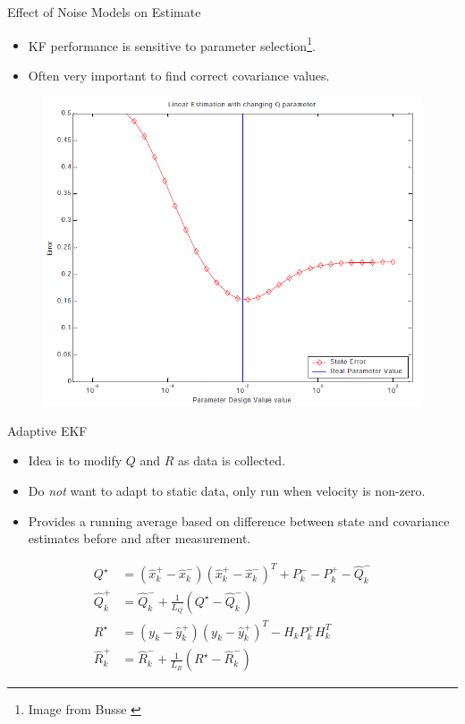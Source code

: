 \documentclass[hyperref={pdfpagelabels=false}]{beamer}
\begin{document}
\begin{frame}{Effect of Noise Models on Estimate}
\begin{itemize}
\item KF performance is sensitive to parameter selection\footnote{Image from Busse \cite{Busse03adaptiveEKF}}.
\item Often very important to find correct covariance values.
\end{itemize}
\begin{figure}[ht!]
	\centering
	\includegraphics[width=.7\textwidth]{images/adaptiveSensitivity}
\end{figure}
\end{frame}

\begin{frame}{Adaptive EKF}
\begin{itemize}
\item Idea is to modify $Q$ and $R$ as data is collected.
\item Do \textit{not} want to adapt to static data, only run when velocity is non-zero.
\item Provides a running average based on difference between state and covariance estimates before and after measurement.
\end{itemize}
\begin{align*}
Q^\star &= \left(\hat{x}_k^+-\hat{x}_k^-\right)\left(\hat{x}_k^+-\hat{x}_k^-\right)^T + P_k^- - P_k^+ - \hat{Q}_k^- \\
\hat{Q}_k^+ &= \hat{Q}_k^- + \frac{1}{L_Q}\left(Q^\star-\hat{Q}_k^-\right) \\
R^\star &= \left(y_k-\hat{y}_k^+\right)\left(y_k-\hat{y}_k^+\right)^T - H_kP_k^+H_k^T \\
\hat{R}_k^+ &= \hat{R}_k^- + \frac{1}{L_R}\left(R^\star-\hat{R}_k^-\right)
\end{align*}
\end{frame}
\end{document}
